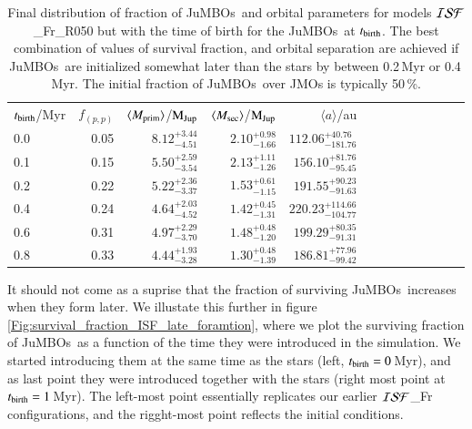 \documentclass[submission,phys]{lib/SciPost}
\newcommand{\MJup}{\mbox{$\mathrm{{M}}_{\rm Jup}$}}
\newcommand{\jumbos}{\mbox{JuMBOs}}
\begin{document}
\begin{table}
  \caption{Final distribution of fraction of \jumbos\, and orbital
    parameters for models ${\cal ISF}$\_Fr\_R050 but with the time of
    birth for the \jumbos\, at $t_{\rm birth}$.  The best combination
    of values of survival fraction, and orbital separation are
    achieved if \jumbos\, are initialized somewhat later than the
    stars by between 0.2\,Myr or 0.4\,Myr.  The initial fraction of
    \jumbos\, over JMOs is typically 50\,\%.  }
 \label{Tab:late_formed_jumbos}
 \centering 
 \begin{tabular}{lrrrrrrrrrrrr}
   \hline\hline
 $t_{\rm birth}$/Myr & $f_{(p,p)}$  & $\langle M_{\rm
  prim} \rangle$/\MJup & $\langle M_{\rm sec} \rangle$/\MJup & $\langle a \rangle$/au \\
 0.0 & 0.05 &  $8.12^{+3.44}_{-4.51}$ & $2.10^{+0.98}_{-1.66}$ & $112.06^{+40.76}_{-181.76}$ \\
 0.1 & 0.15 &  $5.50^{+2.59}_{-3.54}$ & $2.13^{+1.11}_{-1.26}$ & $156.10^{+81.76}_{-95.45}$ \\
 0.2 & 0.22 &  $5.22^{+2.36}_{-3.37}$ & $1.53^{+0.61}_{-1.15}$ & $191.55^{+90.23}_{-91.63}$\\
 0.4 & 0.24 &  $4.64^{+2.03}_{-4.52}$ & $1.42^{+0.45}_{-1.31}$ & $220.23^{+114.66}_{-104.77}$\\
 0.6 & 0.31 &  $4.97^{+2.29}_{-3.70}$ & $1.48^{+0.48}_{-1.20}$ & $199.29^{+80.35}_{-91.31}$ \\
 0.8 & 0.33 &  $4.44^{+1.93}_{-3.28}$ & $1.30^{+0.48}_{-1.39}$ & $186.81^{+77.96}_{-99.42}$ \\
  \hline
 \end{tabular}
\end{table}

It should not come as a suprise that the fraction of surviving
\jumbos\, increases when they form later. We illustate this further in
figure\,\ref{Fig:survival_fraction_ISF_late_foramtion}, where we plot
the surviving fraction of \jumbos\, as a function of the time they
were introduced in the simulation.  We started introducing them at the
same time as the stars (left, $t_{\rm birth} = 0$\,Myr), and as last
point they were introduced together with the stars (right most point
at $t_{\rm birth} = 1$\,Myr).  The left-most point essentially
replicates our earlier ${\cal ISF}$\_Fr configurations, and the
rigght-most point reflects the initial conditions.
\end{document}
